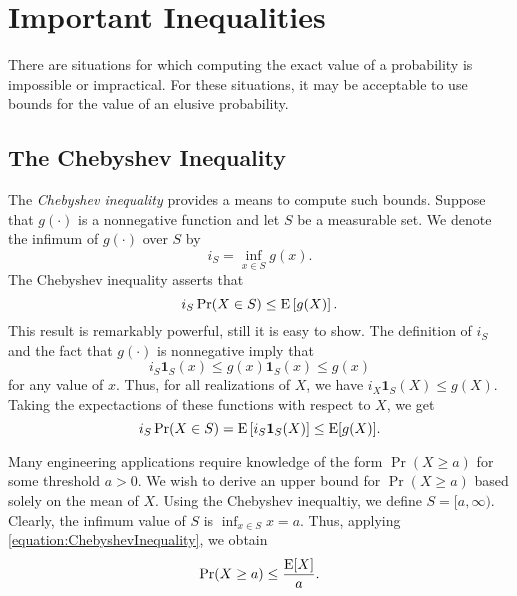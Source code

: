 \section{Important Inequalities}

There are situations for which computing the exact value of a probability is impossible or impractical.
For these situations, it may be acceptable to use bounds for the value of an elusive probability.


\subsection{The Chebyshev Inequality}

The \emph{Chebyshev inequality} provides a means to compute such bounds. 
Suppose that $g (\cdot)$ is a nonnegative function and let $S$ be a measurable set.
We denote the infimum of $g (\cdot)$ over $S$ by
\begin{equation*}
i_S = \inf_{ x \in S } g (x) .
\end{equation*}
The Chebyshev inequality asserts that
\begin{equation} \label{equation:ChebyshevInequality}
i_S \Pr (X \in S)
\leq \mathrm{E} \left[ g(X) \right] .
\end{equation}
This result is remarkably powerful, still it is easy to show.
The definition of $i_S$ and the fact that $g (\cdot)$ is nonnegative imply that
\begin{equation*}
i_S \mathbf{1}_S (x) \leq g(x) \mathbf{1}_S (x) \leq g(x)
\end{equation*}
for any value of $x$.
Thus, for all realizations of $X$, we have $i_X \mathbf{1}_S (X) \leq g(X)$.
Taking the expectactions of these functions with respect to $X$, we get
\begin{equation*}
i_S \Pr (X \in S)
= \mathrm{E} \left[ i_S \mathbf{1}_S (X) \right]
\leq \mathrm{E} [g (X)] .
\end{equation*}

\begin{example}
Many engineering applications require knowledge of the form $\Pr (X \geq a)$ for some threshold $a > 0$.
We wish to derive an upper bound for $\Pr (X \geq a)$ based solely on the mean of $X$.
Using the Chebyshev inequaltiy, we define $S = [a, \infty)$.
Clearly, the infimum value of $S$ is $\inf_{x \in S} x = a$.
Thus, applying \eqref{equation:ChebyshevInequality}, we obtain
\begin{equation*}
\Pr (X \geq a) \leq \frac{ \mathrm{E} [X] }{ a } .
\end{equation*}
\end{example}

